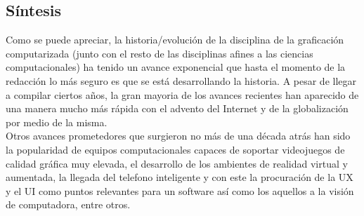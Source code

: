 \documentclass[letterpaper, 12pt]{article}
\begin{document}
\begin{justify}
        \section*{Síntesis}
        \justify
        Como se puede apreciar, la historia/evolución de la disciplina de la graficación computarizada (junto con el resto de las disciplinas afines a las ciencias computacionales) ha tenido un avance exponencial
        que hasta el momento de la redacción lo más seguro es que se está desarrollando la historia. A pesar de llegar a compilar ciertos años, la gran mayoria de los avances recientes han aparecido de una manera mucho más rápida con el advento del Internet
        y de la globalización por medio de la misma. 
        \\\newline
        Otros avances prometedores que surgieron no más de una década atrás han sido la popularidad de equipos computacionales capaces de soportar videojuegos de calidad
        gráfica muy elevada, el desarrollo de los ambientes de realidad virtual y aumentada, la llegada del telefono inteligente y con este la procuración de la UX y el UI como puntos relevantes para un software así como los aquellos a la 
        visión de computadora, entre otros.
    \end{justify}

    \newpage
        \thispagestyle{empty}
        \printbibliography  
\end{document}
